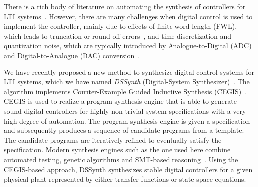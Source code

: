 \documentclass[conference]{IEEEtran}
\begin{document}
There is a rich body of literature on automating the synthesis of
controllers for LTI systems~\cite{mazo2010pessoa,
DBLP:conf/emsoft/RavanbakhshS16, economakos2016automated}.  However, there
are many challenges when digital control is used to implement the
controller, mainly due to effects of finite-word length (FWL), which leads
to truncation or round-off errors~\cite{Guang2013, Istepanian2001}, and time
discretization and quantization noise, which are typically introduced by
Analogue-to-Digital (ADC) and Digital-to-Analogue (DAC)
conversion~\cite{astrom1997computer}.

We have recently proposed a new method to synthesize digital control systems
for LTI systems, which we have named \emph{DSSynth} (Digital-System
Synthesizer)~\cite{abate2017, abatecav2017}.  The algorithm implements
Counter-Example Guided Inductive Synthesis
(CEGIS)~\cite{DBLP:conf/asplos/Solar-LezamaTBSS06}.  CEGIS is used to
realize a program synthesis engine that is able to generate sound digital
controllers for highly non-trivial system specifications with a very high
degree of automation.  The program synthesis engine is given a specification
and subsequently produces a sequence of candidate programs from a template. 
The candidate programs are iteratively refined to eventually satisfy the
specification.  Modern synthesis engines such as the one used here combine
automated testing, genetic algorithms and SMT-based
reasoning~\cite{DBLP:journals/corr/AlurFSS16a, DBLP:conf/lpar/DavidKL15}. 
Using the CEGIS-based approach, DSSynth synthesizes stable digital
controllers for a given physical plant represented by either transfer
functions or state-space equations.
\end{document}
